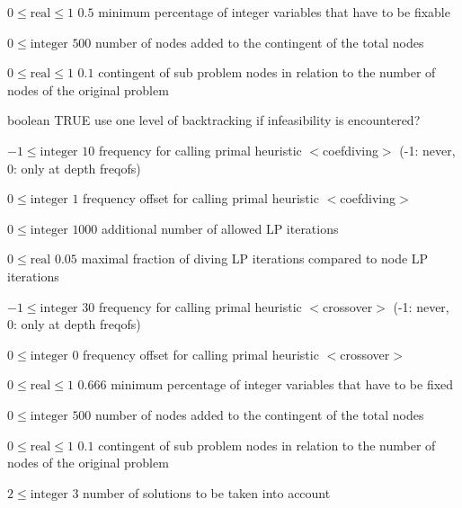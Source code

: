 %
{$0\leq\textrm{real}\leq1$}%
{$0.5$}%
{minimum percentage of integer variables that have to be fixable}%
{}

%
{$0\leq\textrm{integer}$}%
{$500$}%
{number of nodes added to the contingent of the total nodes}%
{}

%
{$0\leq\textrm{real}\leq1$}%
{$0.1$}%
{contingent of sub problem nodes in relation to the number of nodes of the original problem}%
{}

%
{boolean}%
{TRUE}%
{use one level of backtracking if infeasibility is encountered?}%
{}

%
{$-1\leq\textrm{integer}$}%
{$10$}%
{frequency for calling primal heuristic $<$coefdiving$>$ (-1: never, 0: only at depth freqofs)}%
{}

%
{$0\leq\textrm{integer}$}%
{$1$}%
{frequency offset for calling primal heuristic $<$coefdiving$>$}%
{}

%
{$0\leq\textrm{integer}$}%
{$1000$}%
{additional number of allowed LP iterations}%
{}

%
{$0\leq\textrm{real}$}%
{$0.05$}%
{maximal fraction of diving LP iterations compared to node LP iterations}%
{}

%
{$-1\leq\textrm{integer}$}%
{$30$}%
{frequency for calling primal heuristic $<$crossover$>$ (-1: never, 0: only at depth freqofs)}%
{}

%
{$0\leq\textrm{integer}$}%
{$0$}%
{frequency offset for calling primal heuristic $<$crossover$>$}%
{}

%
{$0\leq\textrm{real}\leq1$}%
{$0.666$}%
{minimum percentage of integer variables that have to be fixed}%
{}

%
{$0\leq\textrm{integer}$}%
{$500$}%
{number of nodes added to the contingent of the total nodes}%
{}

%
{$0\leq\textrm{real}\leq1$}%
{$0.1$}%
{contingent of sub problem nodes in relation to the number of nodes of the original problem}%
{}

%
{$2\leq\textrm{integer}$}%
{$3$}%
{number of solutions to be taken into account}%
{}

